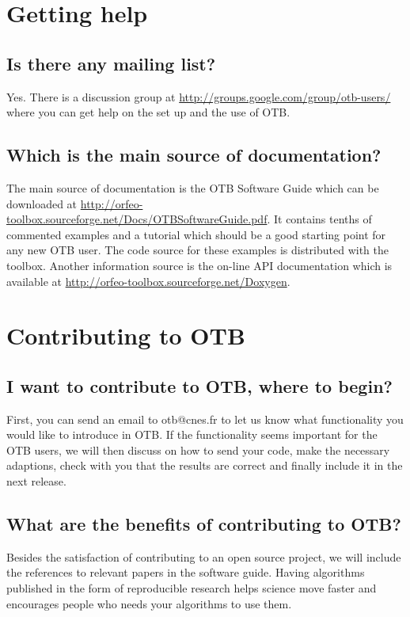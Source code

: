 \section{Getting help}
\subsection{Is there any mailing list?}
Yes. There is a discussion group at
\url{http://groups.google.com/group/otb-users/} where you can get help
on the set up and the use of OTB.

\subsection{Which is the main source of documentation?}
The main source of documentation is the OTB Software Guide which can
be downloaded at
\url{http://orfeo-toolbox.sourceforge.net/Docs/OTBSoftwareGuide.pdf}. It
contains tenths of commented examples and a tutorial which should be a good starting
point for any new OTB user. The code source for these examples is
distributed with the toolbox. Another information source is the
on-line API documentation which is available at \url{http://orfeo-toolbox.sourceforge.net/Doxygen}.

\section{Contributing to OTB}

\subsection{I want to contribute to OTB, where to begin?}

First, you can send an email to otb@cnes.fr to let us know what functionality 
you would like to introduce in OTB. If the functionality seems important for the 
OTB users, we will then discuss on how to send your code,
make the necessary adaptions, check with you that the results are correct and finally
include it in the next release.

\subsection{What are the benefits of contributing to OTB?}

Besides the satisfaction of contributing to an open source project, we will include
the references to relevant papers in the software guide. Having algorithms
published in the form of reproducible research helps science move faster and 
encourages people who needs your algorithms to use them.

